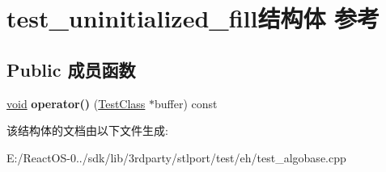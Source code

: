 \hypertarget{structtest__uninitialized__fill}{}\section{test\+\_\+uninitialized\+\_\+fill结构体 参考}
\label{structtest__uninitialized__fill}
\subsection*{Public 成员函数}
\begin{DoxyCompactItemize}
\item 
\mbox{\label{structtest__uninitialized__fill_a9640c3fae106968cbe119f46ccdcf64c}} 
\hyperlink{interfacevoid}{void} {\bfseries operator()} (\hyperlink{class_test_class}{Test\+Class} $\ast$buffer) const
\end{DoxyCompactItemize}


该结构体的文档由以下文件生成\+:\begin{DoxyCompactItemize}
\item 
E\+:/\+React\+O\+S-\/0../sdk/lib/3rdparty/stlport/test/eh/test\+\_\+algobase.\+cpp\end{DoxyCompactItemize}
